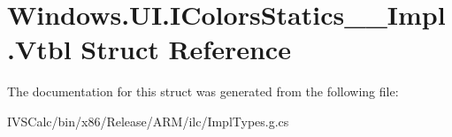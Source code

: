 \hypertarget{struct_windows_1_1_u_i_1_1_i_colors_statics_____impl_1_1_vtbl}{}\section{Windows.\+U\+I.\+I\+Colors\+Statics\+\_\+\+\_\+\+Impl.\+Vtbl Struct Reference}
\label{struct_windows_1_1_u_i_1_1_i_colors_statics_____impl_1_1_vtbl}


The documentation for this struct was generated from the following file\+:\begin{DoxyCompactItemize}
\item 
I\+V\+S\+Calc/bin/x86/\+Release/\+A\+R\+M/ilc/Impl\+Types.\+g.\+cs\end{DoxyCompactItemize}
